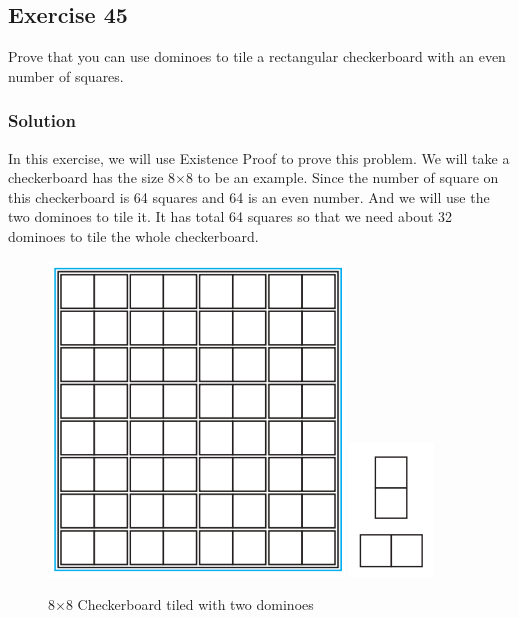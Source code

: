 \documentclass{article}
\begin{document}
\subsection*{Exercise 45}
Prove that you can use dominoes to tile a rectangular checkerboard with an even number of squares.
\subsubsection*{Solution}
In this exercise, we will use Existence Proof to prove this problem. We will take a checkerboard has the size 8$\times$8 to be an example. Since the number of square on this checkerboard is 64 squares and 64 is an even number. And we will use the two dominoes to tile it.
It has total 64 squares so that we need about 32 dominoes to tile the whole checkerboard.\\
\begin{center}
\clearpage
\end{center}
\begin{figure}
    \begin{center}
        \includegraphics[width = 0.7\textwidth]{8x8TileCheckerBoard.png}
        \includegraphics[width = 0.2\textwidth]{2dominoes.png}
    \end{center}
    \caption{8$\times$8 Checkerboard tiled with two dominoes}
\end{figure}
\end{document}

